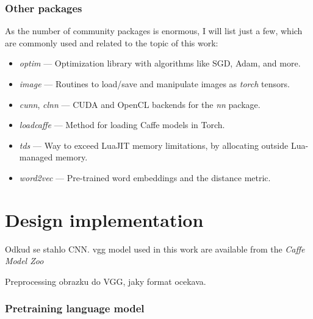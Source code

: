 \subsubsection{Other packages}

As the number of community packages is enormous, I will list just a few, which are commonly used and related to the topic of this work:

\vspace{5mm}
\begin{minipage}{0.9\textwidth}
	\begin{itemize}
		\item \emph{optim} --- Optimization library with algorithms like SGD, Adam, and more.
		\item \emph{image} --- Routines to load/save and manipulate images as \emph{torch} tensors.
		\item \emph{cunn}, \emph{clnn} --- CUDA and OpenCL backends for the \emph{nn} package.
		\item \emph{loadcaffe} --- Method for loading Caffe models in Torch.
		\item \emph{tds} --- Way to exceed LuaJIT memory limitations, by allocating outside Lua-managed memory.
		\item \emph{word2vec} --- Pre-trained word embeddings and the distance metric.
	\end{itemize}
\end{minipage}
\vspace{3mm}

\section{Design implementation} \label{sec:designimplem}
Odkud se stahlo CNN. \gls{vgg} model used in this work are available from the \emph{Caffe Model Zoo}

Preprocessing obrazku do VGG, jaky format ocekava.


\subsubsection{Pretraining language model}


